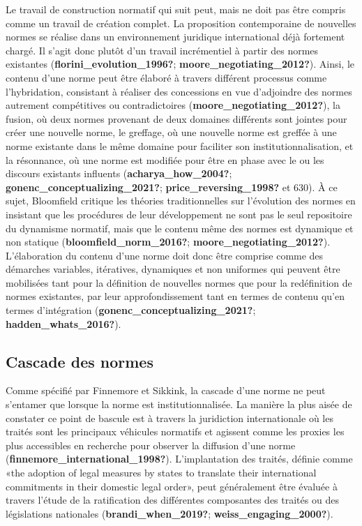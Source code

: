 \documentclass[12pt]{ulaval}
\begin{document}
Le travail de construction normatif qui suit peut, mais ne doit pas être compris comme un travail de création complet. La proposition contemporaine de nouvelles normes se réalise dans un environnement juridique international déjà fortement chargé. Il s'agit donc plutôt d'un travail incrémentiel à partir des normes existantes (\textbf{florini\_evolution\_1996?}; \textbf{moore\_negotiating\_2012?}). Ainsi, le contenu d'une norme peut être élaboré à travers différent processus comme l'hybridation, consistant à réaliser des concessions en vue d'adjoindre des normes autrement compétitives ou contradictoires (\textbf{moore\_negotiating\_2012?}), la fusion, où deux normes provenant de deux domaines différents sont jointes pour créer une nouvelle norme, le greffage, où une nouvelle norme est greffée à une norme existante dans le même domaine pour faciliter son institutionnalisation, et la résonnance, où une norme est modifiée pour être en phase avec le ou les discours existants influents (\textbf{acharya\_how\_2004?}; \textbf{gonenc\_conceptualizing\_2021?}; \textbf{price\_reversing\_1998?} et 630). À ce sujet, Bloomfield critique les théories traditionnelles sur l'évolution des normes en insistant que les procédures de leur développement ne sont pas le seul repositoire du dynamisme normatif, mais que le contenu même des normes est dynamique et non statique (\textbf{bloomfield\_norm\_2016?}; \textbf{moore\_negotiating\_2012?}). L'élaboration du contenu d'une norme doit donc être comprise comme des démarches variables, itératives, dynamiques et non uniformes qui peuvent être mobilisées tant pour la définition de nouvelles normes que pour la redéfinition de normes existantes, par leur approfondissement tant en termes de contenu qu'en termes d'intégration (\textbf{gonenc\_conceptualizing\_2021?}; \textbf{hadden\_whats\_2016?}).

\subsection{Cascade des normes}\label{cascade-des-normes}

Comme spécifié par Finnemore et Sikkink, la cascade d'une norme ne peut s'entamer que lorsque la norme est institutionnalisée. La manière la plus aisée de constater ce point de bascule est à travers la juridiction internationale où les traités sont les principaux véhicules normatifs et agissent comme les proxies les plus accessibles en recherche pour observer la diffusion d'une norme (\textbf{finnemore\_international\_1998?}). L'implantation des traités, définie comme «the adoption of legal measures by states to translate their international commitments in their domestic legal order», peut généralement être évaluée à travers l'étude de la ratification des différentes composantes des traités ou des législations nationales (\textbf{brandi\_when\_2019?}; \textbf{weiss\_engaging\_2000?}).
\end{document}
